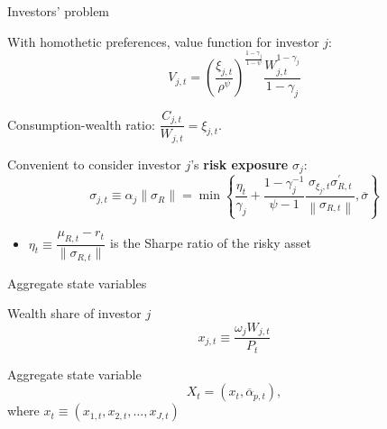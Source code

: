 \documentclass[12pt,aspectratio=169]{beamer}
\newenvironment{wideitemize}{\itemize\addtolength{\itemsep}{10pt}}{\enditemize}
\begin{document}
\begin{frame}{Investors' problem}
    \begin{wideitemize}
        \item With homothetic preferences, value function for investor $j$:
        \[V_{j, t}=\left(\frac{\xi_{j, t}}{\rho^{\psi}}\right)^{\frac{1-\gamma_{j}}{1-\psi}} \frac{W_{j, t}^{1-\gamma_{j}}}{1-\gamma_{j}}\]
        \item Consumption-wealth ratio: $\dfrac{C_{j, t}}{W_{j, t}}=\xi_{j, t}.$
        \item Convenient to consider investor $j$'s \textbf{risk exposure} $\sigma_j$:
        \[\sigma_{j, t}\equiv\alpha_j\|\sigma_R\|=\min \left\{\frac{\eta_{t}}{\gamma_{j}}+\frac{1-\gamma_{j}^{-1}}{\psi-1} \frac{\sigma_{\xi_{j}, t} \sigma_{R, t}^{\prime}}{\left\|\sigma_{R, t}\right\|}, \overline{\sigma}\right\}\]
        \begin{itemize}
            \item $\eta_t \equiv \dfrac{\mu_{R,t}-r_t}{\|\sigma_{R,t}\|}$ is the Sharpe ratio of the risky asset
        \end{itemize}
    \end{wideitemize}
\end{frame}

\begin{frame}{Aggregate state variables}
    \begin{wideitemize}
        \item Wealth share of investor $j$
        \[x_{j, t} \equiv \frac{\omega_{j} W_{j, t}}{P_{t}}\]
        \item Aggregate state variable 
        \[X_{t}=\left(x_{t}, \overline{\alpha}_{p, t}\right),\]
        where $x_{t} \equiv\left(x_{1, t}, x_{2, t}, \ldots, x_{J, t}\right)$
    \end{wideitemize}
\end{frame}
\end{document}
